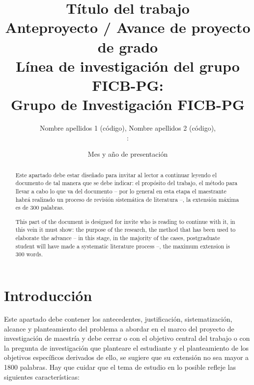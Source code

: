 \documentclass[spanish, 12pt, letterpaper]{poli}
\title{%
	Título del trabajo \\
	\normalfont
	\color{black}
	\normalsize Anteproyecto / Avance de proyecto de grado \\
	\normalsize Línea de investigación del grupo FICB-PG:  \\
	\normalsize Grupo de Investigación FICB-PG
}
\author{%
	Nombre apellidos 1 (código), Nombre apellidos 2 (código), \\
	\normalfont
	\normalsize \color{black}{Asesor temático}: \color{poliBlue}{Nombre apellidos y acrónimo del último título obtenido}
}
\date{Mes y año de presentación}
\begin{document}
\renewcommand{\BOthers}[1]{et al.\hbox{}}

\maketitle

\begin{abstract}
	Este apartado debe estar diseñado para invitar al lector a continuar leyendo el documento de tal manera que se debe indicar: el propósito del trabajo, el método para llevar a cabo lo que va del documento – por lo general en esta etapa el maestrante habrá realizado un proceso de revisión sistemática de literatura \cite{rave2012como} –, la extensión máxima es de 300 palabras.
\end{abstract}

\renewcommand{\abstractname}{Abstract}
\begin{abstract}
	This part of the document is designed for invite who is reading to continue with it, in this vein it must show: the purpose of the research, the method that has been used to elaborate the advance – in this stage, in the majority of the cases, postgraduate student will have made a systematic literature process \cite{rave2012como} –, the maximum extension is 300 words.
\end{abstract}


\section{Introducción}
Este apartado debe contener los antecedentes, justificación, sistematización, alcance y planteamiento del problema a abordar en el marco del proyecto de investigación de maestría y debe cerrar o con el objetivo central del trabajo o con la pregunta de investigación que planteare el estudiante y el planteamiento de los objetivos específicos derivados de ello, se sugiere que su extensión no sea mayor a 1800 palabras. Hay que cuidar que el tema de estudio en lo posible refleje las siguientes características:
\end{document}
